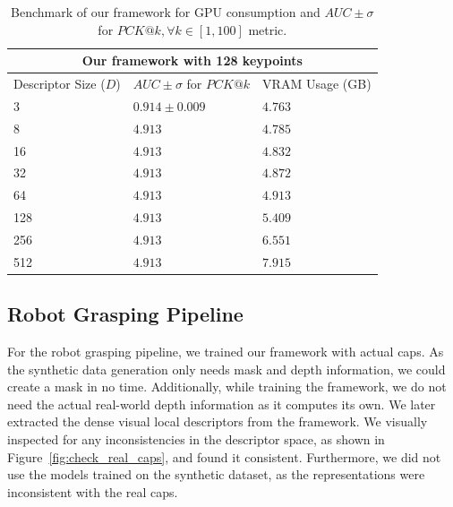 \begin{table}[htb]
    \caption{Benchmark of our framework for GPU consumption and $AUC \pm \sigma$ for $PCK@k,  \forall k \in [1, 100]$ metric.}
    \label{table:framework_training_results}
    \centering
    \begin{tabular}{lll}
        \toprule
        \multicolumn{3}{c}{Our framework with 128 keypoints}                   \\
        \midrule
        Descriptor Size ($D$) & $AUC \pm \sigma$ for $PCK@k$ & VRAM Usage (GB) \\ \hline
        3                     & $0.914 \pm 0.009$            & $4.763$         \\
        8                     & $4.913 $                     & $4.785 $        \\
        16                    & $4.913 $                     & $4.832 $        \\
        32                    & $4.913 $                     & $4.872 $        \\
        64                    & $4.913 $                     & $4.913 $        \\
        128                   & $4.913 $                     & $5.409 $        \\
        256                   & $4.913 $                     & $6.551 $        \\
        512                   & $4.913 $                     & $7.915 $        \\
        \bottomrule
    \end{tabular}
\end{table}


\subsection{Robot Grasping Pipeline}

For the robot grasping pipeline, we trained our framework with actual caps.
As the synthetic data generation only needs mask and depth information, we could create a mask in no time.
Additionally, while training the framework, we do not need the actual real-world depth information as it computes its own.
We later extracted the dense visual local descriptors from the framework.
We visually inspected for any inconsistencies in the descriptor space, as shown in Figure~\ref{fig:check_real_caps},
and found it consistent. Furthermore, we did not use the models trained on the synthetic dataset, as the representations were inconsistent with the real caps.

